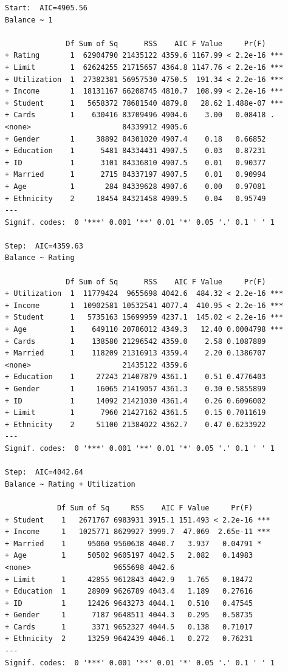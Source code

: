 \documentclass[
]{article}
\begin{document}
\begin{verbatim}
Start:  AIC=4905.56
Balance ~ 1

              Df Sum of Sq      RSS    AIC F Value     Pr(F)    
+ Rating       1  62904790 21435122 4359.6 1167.99 < 2.2e-16 ***
+ Limit        1  62624255 21715657 4364.8 1147.76 < 2.2e-16 ***
+ Utilization  1  27382381 56957530 4750.5  191.34 < 2.2e-16 ***
+ Income       1  18131167 66208745 4810.7  108.99 < 2.2e-16 ***
+ Student      1   5658372 78681540 4879.8   28.62 1.488e-07 ***
+ Cards        1    630416 83709496 4904.6    3.00   0.08418 .  
<none>                     84339912 4905.6                      
+ Gender       1     38892 84301020 4907.4    0.18   0.66852    
+ Education    1      5481 84334431 4907.5    0.03   0.87231    
+ ID           1      3101 84336810 4907.5    0.01   0.90377    
+ Married      1      2715 84337197 4907.5    0.01   0.90994    
+ Age          1       284 84339628 4907.6    0.00   0.97081    
+ Ethnicity    2     18454 84321458 4909.5    0.04   0.95749    
---
Signif. codes:  0 '***' 0.001 '**' 0.01 '*' 0.05 '.' 0.1 ' ' 1

Step:  AIC=4359.63
Balance ~ Rating

              Df Sum of Sq      RSS    AIC F Value     Pr(F)    
+ Utilization  1  11779424  9655698 4042.6  484.32 < 2.2e-16 ***
+ Income       1  10902581 10532541 4077.4  410.95 < 2.2e-16 ***
+ Student      1   5735163 15699959 4237.1  145.02 < 2.2e-16 ***
+ Age          1    649110 20786012 4349.3   12.40 0.0004798 ***
+ Cards        1    138580 21296542 4359.0    2.58 0.1087889    
+ Married      1    118209 21316913 4359.4    2.20 0.1386707    
<none>                     21435122 4359.6                      
+ Education    1     27243 21407879 4361.1    0.51 0.4776403    
+ Gender       1     16065 21419057 4361.3    0.30 0.5855899    
+ ID           1     14092 21421030 4361.4    0.26 0.6096002    
+ Limit        1      7960 21427162 4361.5    0.15 0.7011619    
+ Ethnicity    2     51100 21384022 4362.7    0.47 0.6233922    
---
Signif. codes:  0 '***' 0.001 '**' 0.01 '*' 0.05 '.' 0.1 ' ' 1

Step:  AIC=4042.64
Balance ~ Rating + Utilization

            Df Sum of Sq     RSS    AIC F Value     Pr(F)    
+ Student    1   2671767 6983931 3915.1 151.493 < 2.2e-16 ***
+ Income     1   1025771 8629927 3999.7  47.069  2.65e-11 ***
+ Married    1     95060 9560638 4040.7   3.937   0.04791 *  
+ Age        1     50502 9605197 4042.5   2.082   0.14983    
<none>                   9655698 4042.6                      
+ Limit      1     42855 9612843 4042.9   1.765   0.18472    
+ Education  1     28909 9626789 4043.4   1.189   0.27616    
+ ID         1     12426 9643273 4044.1   0.510   0.47545    
+ Gender     1      7187 9648511 4044.3   0.295   0.58735    
+ Cards      1      3371 9652327 4044.5   0.138   0.71017    
+ Ethnicity  2     13259 9642439 4046.1   0.272   0.76231    
---
Signif. codes:  0 '***' 0.001 '**' 0.01 '*' 0.05 '.' 0.1 ' ' 1


\end{verbatim}
\end{document}
